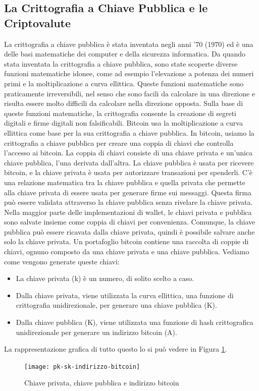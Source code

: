\subsection{La Crittografia a Chiave Pubblica e le Criptovalute}
La crittografia a chiave pubblica è stata inventata negli anni '70 (1970) ed è una delle basi matematiche dei computer e della sicurezza informatica.
Da quando stata inventata la crittografia a chiave pubblica, sono state scoperte diverse funzioni matematiche idonee, come ad esempio l’elevazione a potenza dei numeri primi e la moltiplicazione a curva ellittica. Queste funzioni matematiche sono praticamente irreversibili, nel senso che sono facili da calcolare in una direzione e risulta essere molto difficili da calcolare nella direzione opposta. Sulla base di queste funzioni matematiche, la crittografia consente la creazione di segreti digitali e firme digitali non falsificabili. Bitcoin usa la moltiplicazione a curva ellittica come base per la sua crittografia a chiave pubblica.
In bitcoin, usiamo la crittografia a chiave pubblica per creare una coppia di chiavi che controlla l’accesso ai bitcoin. La coppia di chiavi consiste di una chiave privata e un’unica chiave pubblica, l'una derivata dall'altra. La chiave pubblica è usata per ricevere bitcoin, e la chiave privata è usata per autorizzare transazioni per spenderli. C’è una relazione matematica tra la chiave pubblica e quella privata che permette alla chiave privata di essere usata per generare firme sui messaggi. Questa firma può essere validata attraverso la chiave pubblica senza rivelare la chiave privata.
Nella maggior parte delle implementazioni di wallet, le chiavi privata e pubblica sono
salvate insieme come coppia di chiavi per convenienza. Comunque, la chiave pubblica
può essere ricavata dalla chiave privata, quindi è possibile salvare anche solo la
chiave privata.
Un portafoglio bitcoin contiene una raccolta di coppie di chiavi, ognuno composto da una chiave privata e una chiave pubblica. Vediamo come vengono generate queste chiavi:
\begin{itemize}
	\item La chiave privata (k) è un numero, di solito scelto a caso.
	\item Dalla chiave privata, viene utilizzata la curva ellittica, una funzione di crittografia unidirezionale, per generare una chiave pubblica (K).
	\item Dalla chiave pubblica (K), viene utilizzata una funzione di hash crittografica unidirezionale per generare un indirizzo bitcoin (A).
\end{itemize}
La rappresentazione grafica di tutto questo lo si può vedere in Figura \ref{fig:pk-sk-indirizzo-bitcoin}.
\begin{figure}
	\centering 
	\texttt{[image: pk-sk-indirizzo-bitcoin]} 
	\caption[Chiave privata, chiave pubblica e indirizzo bitcoin]{Chiave privata, chiave pubblica e indirizzo bitcoin}
	\label{fig:pk-sk-indirizzo-bitcoin} 
\end{figure}

